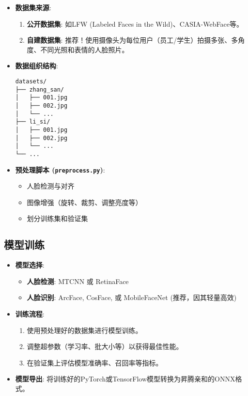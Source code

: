 \begin{itemize}
\item
  \textbf{数据集来源}:

  \begin{enumerate}
  \def\labelenumi{\arabic{enumi}.}
  \tightlist
  \item
    \textbf{公开数据集}: 如LFW (Labeled Faces in the
    Wild)、CASIA-WebFace等。
  \item
    \textbf{自建数据集}:
    推荐！使用摄像头为每位用户（员工/学生）拍摄多张、多角度、不同光照和表情的人脸照片。
  \end{enumerate}
\item
  \textbf{数据组织结构}:

\begin{lstlisting}
datasets/
├── zhang_san/
│   ├── 001.jpg
│   ├── 002.jpg
│   └── ...
├── li_si/
│   ├── 001.jpg
│   ├── 002.jpg
│   └── ...
└── ...
\end{lstlisting}
\item
  \textbf{预处理脚本 (\passthrough{\lstinline!preprocess.py!})}:

  \begin{itemize}
  \tightlist
  \item
    人脸检测与对齐
  \item
    图像增强（旋转、裁剪、调整亮度等）
  \item
    划分训练集和验证集
  \end{itemize}
\end{itemize}

\subsection{模型训练}\label{ux6a21ux578bux8badux7ec3}

\begin{itemize}
\tightlist
\item
  \textbf{模型选择}:

  \begin{itemize}
  \tightlist
  \item
    \textbf{人脸检测}: MTCNN 或 RetinaFace
  \item
    \textbf{人脸识别}: ArcFace, CosFace, 或 MobileFaceNet
    (推荐，因其轻量高效)
  \end{itemize}
\item
  \textbf{训练流程}:

  \begin{enumerate}
  \def\labelenumi{\arabic{enumi}.}
  \tightlist
  \item
    使用预处理好的数据集进行模型训练。
  \item
    调整超参数（学习率、批大小等）以获得最佳性能。
  \item
    在验证集上评估模型准确率、召回率等指标。
  \end{enumerate}
\item
  \textbf{模型导出}:
  将训练好的PyTorch或TensorFlow模型转换为昇腾亲和的ONNX格式。
\end{itemize}

